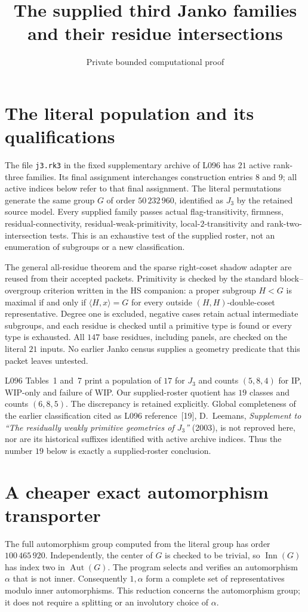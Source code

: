 \documentclass[11pt]{article}
\title{The supplied third Janko families and their residue intersections}
\author{Private bounded computational proof}\date{}
\begin{document}
\maketitle
\section{The literal population and its qualifications}
The file \texttt{j3.rk3} in the fixed supplementary archive of L096 has
$21$ active rank-three families. Its final assignment interchanges
construction entries $8$ and $9$; all active indices below refer to that
final assignment. The literal permutations generate the same group
$G$ of order $50\,232\,960$, identified as $J_3$ by the retained source
model. Every supplied family passes actual flag-transitivity, firmness,
residual-connectivity, residual-weak-primitivity, local-$2$-transitivity
and rank-two-intersection tests. This is an exhaustive test of the
supplied roster, not an enumeration of subgroups or a new classification.

The general all-residue theorem and the sparse right-coset shadow adapter
are reused from their accepted packets. Primitivity is checked by the
standard block--overgroup criterion written in the HS companion: a proper
subgroup $H<G$ is maximal if and only if
$\langle H,x\rangle=G$ for every outside $(H,H)$-double-coset representative.
Degree one is excluded, negative cases retain actual intermediate
subgroups, and each residue is checked until a primitive type is found
or every type is exhausted. All $147$ base residues, including panels,
are checked on the literal $21$ inputs. No earlier Janko census supplies
a geometry predicate that this packet leaves untested.

L096 Tables~1 and~7 print a population of $17$ for $J_3$ and counts
$(5,8,4)$ for IP, WIP-only and failure of WIP. Our supplied-roster quotient
has $19$ classes and counts $(6,8,5)$. The discrepancy is retained
explicitly. Global completeness of the earlier classification cited as
L096 reference~[19], D.~Leemans, \emph{Supplement to ``The residually weakly
primitive geometries of $J_3$''} (2003), is not reproved here, nor are its
historical suffixes identified with active archive indices. Thus the
number $19$ below is exactly a supplied-roster conclusion.

\section{A cheaper exact automorphism transporter}
The full automorphism group computed from the literal group has order
$100\,465\,920$. Independently, the center of $G$ is checked to be trivial,
so $\operatorname{Inn}(G)$ has index two in $\operatorname{Aut}(G)$.
The program selects and verifies an automorphism $\alpha$ that is not
inner. Consequently $1,\alpha$ form a complete set of representatives
modulo inner automorphisms. This reduction concerns the automorphism
group; it does not require a splitting or an involutory choice of $\alpha$.
\end{document}
